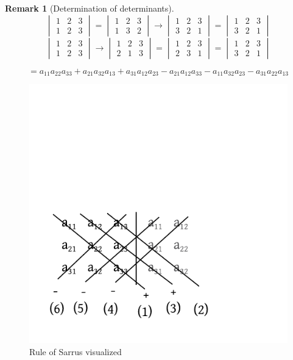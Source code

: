 \documentclass[a4paper,landscape,twocolumn]{article}
\newtheorem{rem}{Remark}
\begin{document}
\begin{rem}[Determination of determinants]
  \[
    \begin{vmatrix} 1 & 2 & 3 \\ 1 & 2 & 3 \end{vmatrix}
    = \begin{vmatrix} 1 & 2 & 3 \\ 1 & 3 & 2 \end{vmatrix}
    \to \begin{vmatrix} 1 & 2 & 3 \\ 3 & 2 & 1 \end{vmatrix}
    = \begin{vmatrix} 1 & 2 & 3 \\ 3 & 2 & 1 \end{vmatrix}
  \]
  \[
    \begin{vmatrix} 1 & 2 & 3 \\ 1 & 2 & 3 \end{vmatrix}
    \to \begin{vmatrix} 1 & 2 & 3 \\ 2 & 1 & 3 \end{vmatrix}
    = \begin{vmatrix} 1 & 2 & 3 \\ 2 & 3 & 1 \end{vmatrix}
    = \begin{vmatrix} 1 & 2 & 3 \\ 3 & 2 & 1 \end{vmatrix}
  \]

  \[ = a_{11} a_{22} a_{33} + a_{21} a_{32} a_{13} + a_{31} a_{12} a_{23} - a_{21} a_{12} a_{33} - a_{11} a_{32} a_{23} - a_{31} a_{22} a_{13} \]
\end{rem}

\begin{figure}[!h]
  \begin{center}
    \includegraphics{img/rule_of_sarrus.pdf}
    \caption{Rule of Sarrus visualized}
    \label{img:sarrus}
  \end{center}
\end{figure}
\end{document}
